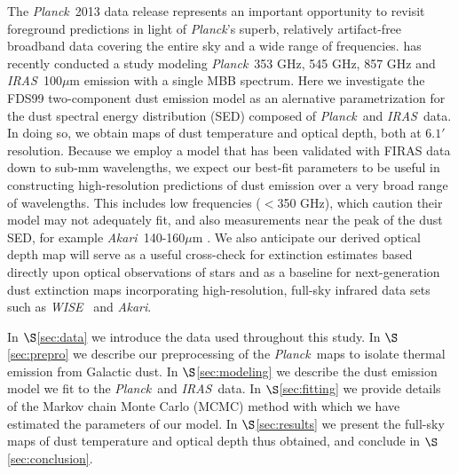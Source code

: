 \documentclass{emulateapj}
\newcommand{\IRAS}{{\it IRAS}}
\newcommand{\PLANCK}{{\it Planck}}
\newcommand{\AKARI}{{\it Akari}}
\newcommand{\WISE}{{\it WISE}}
\begin{document}


The \PLANCK~2013 data release \citep{planck2013} represents an important 
opportunity to revisit foreground predictions in light of \PLANCK's superb, 
relatively artifact-free broadband data covering the entire sky and a wide 
range of frequencies. \cite{planckdust} has recently conducted a study modeling
\PLANCK~353 GHz, 545 GHz, 857 GHz and \IRAS~100$\mu$m emission with a single
MBB spectrum. Here we investigate the FDS99 two-component dust emission model 
as an alernative parametrization for the dust spectral energy distribution 
(SED) composed  of \PLANCK~and \IRAS~data. In doing so, we obtain maps of dust 
temperature and optical depth, both at $6.1'$ resolution. Because we employ a 
model that has been validated with FIRAS data down to sub-mm wavelengths, we 
expect our best-fit parameters to be useful in constructing high-resolution 
predictions of dust emission over a very broad range of wavelengths. This 
includes low frequencies ($<$350 GHz), which \cite{planckdust} caution their 
model may not adequately fit, and also measurements near the peak of the dust 
SED, for example \AKARI~140-160$\mu$m \citep{akari}. We also anticipate our 
derived optical depth map will serve as a useful cross-check for extinction 
estimates based directly upon optical observations of stars
\citep[e.g.][]{green14} and as a baseline for next-generation dust extinction 
maps incorporating high-resolution, full-sky infrared data sets such as 
\WISE~\citep{wright10, meisner14} and \AKARI.


In $\S$\ref{sec:data} we introduce the data used throughout this study. In 
$\S$\ref{sec:prepro} we describe our preprocessing of the \PLANCK~maps to 
isolate thermal emission from Galactic dust. In $\S$\ref{sec:modeling} we 
describe the dust emission model we fit to the \PLANCK~and \IRAS~data. In 
$\S$\ref{sec:fitting} we provide details of the Markov chain Monte Carlo (MCMC)
 method with which we have estimated the parameters of our model. In 
$\S$\ref{sec:results} we present the full-sky maps of dust temperature and 
optical depth thus obtained, and conclude in $\S$\ref{sec:conclusion}.
\end{document}
